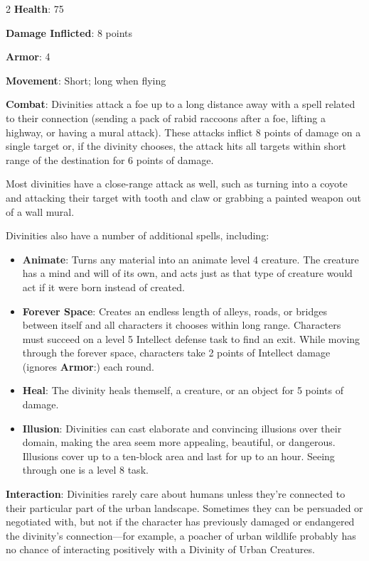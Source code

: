 \begin{multicols}{2}
\textbf{Health}: 75 

\textbf{Damage Inflicted}: 8 points 

\textbf{Armor}: 4 

\textbf{Movement}: Short; long when flying 

\textbf{Combat}: Divinities attack a foe up to a long distance away with a spell related to their connection (sending a pack of rabid raccoons after a foe, lifting a highway, or having a mural attack). These attacks inflict 8 points of damage on a single target or, if the divinity chooses, the attack hits all targets within short range of the destination for 6 points of damage. 

Most divinities have a close-range attack as well, such as turning into a coyote and attacking their target with tooth and claw or grabbing a painted weapon out of a wall mural. 

Divinities also have a number of additional spells, including:

\begin{itemize}
\item \textbf{Animate}: Turns any material into an animate level 4 creature. The creature has a mind and will of its own, and acts just as that type of creature would act if it were born instead of created. 

\item \textbf{Forever Space}: Creates an endless length of alleys, roads, or bridges between itself and all characters it chooses within long range. Characters must succeed on a level 5 Intellect defense task to find an exit. While moving through the forever space, characters take 2 points of Intellect damage (ignores \textbf{Armor}:) each round. 

\item \textbf{Heal}: The divinity heals themself, a creature, or an object for 5 points of damage. 

\item \textbf{Illusion}: Divinities can cast elaborate and convincing illusions over their domain, making the area seem more appealing, beautiful, or dangerous. Illusions cover up to a ten-block area and last for up to an hour. Seeing through one is a level 8 task.
\end{itemize}

\textbf{Interaction}: Divinities rarely care about humans unless they’re connected to their particular part of the urban landscape. Sometimes they can be persuaded or negotiated with, but not if the character has previously damaged or endangered the divinity’s connection—for example, a poacher of urban wildlife probably has no chance of interacting positively with a Divinity of Urban Creatures. 


\end{multicols}
